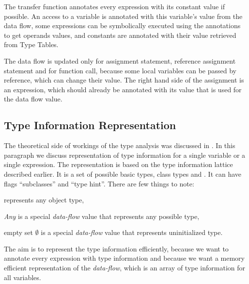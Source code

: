         The transfer function annotates every expression 
        with its constant value if possible. An access to a 
        variable is annotated with this variable's value 
        from the data flow, some expressions can be symbolically 
        executed using the annotations to get operands values, 
        and constants are annotated with their value retrieved 
        from Type Tables.
        
        The data flow is updated only for assignment statement, 
        reference assignment statement and for function call, 
        because some local variables can be passed by reference, 
        which can change their value. The right hand side of 
        the assignment is an expression, which should already be 
        annotated with its value that is used for the data 
        flow value.

    \subsection{Type Information Representation}        
        The theoretical side of workings of the type analysis was 
        discussed in \wsection{} .         
        In this paragraph we discuss representation of 
        type information for a single variable or a single expression. 
        The representation is based on the type information 
        lattice described earlier. It is a set of possible 
        basic types, class types and . It can 
        have flags ``subclasses'' and ``type hint''. 
        There are few things to note:
        \begin{itemize*}
            \item {} represents any object type, 
            \item \emph{Any} is a special \emph{data-flow} value that 
                represents any possible type, 
            \item empty set $\emptyset$  is a special \emph{data-flow} value that 
                represents uninitialized type.
        \end{itemize*}
        
        The aim is to represent the type information efficiently, 
        because we want to annotate every expression with type 
        information and because we want a memory efficient 
        representation of the \emph{data-flow}, which is an 
        array of type information for all variables.
        
